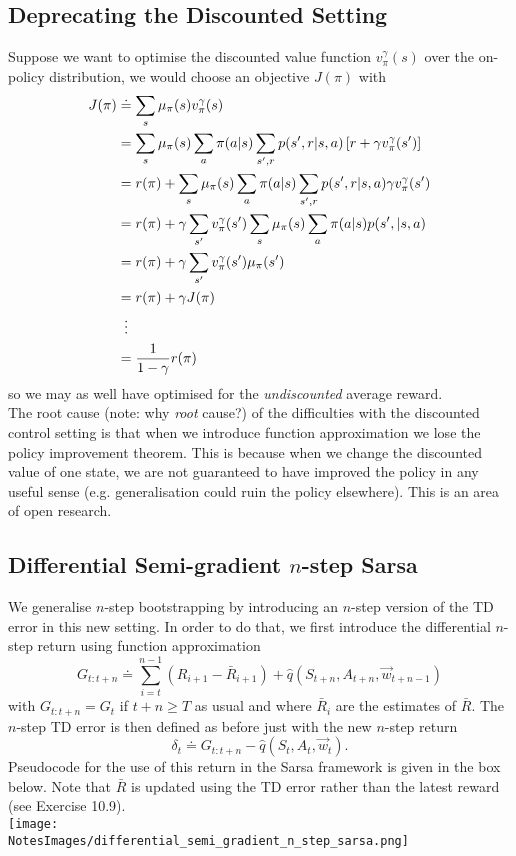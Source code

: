 \subsection{Deprecating the Discounted Setting}
Suppose we want to optimise the discounted value function $v_\pi^\gamma(s)$ over the on-policy distribution, we would choose an objective $J(\pi)$ with
\begin{align}
    J(\pi) &\doteq \sum_s \mu_\pi(s) v_\pi^\gamma(s) \\
           &= \sum_s \mu_\pi(s) \sum_a \pi(a \vert{} s) \sum_{s', r} p(s', r \vert{} s, a) \left[ r + \gamma v_\pi^\gamma(s')\right] \\
           &= r(\pi) + \sum_s \mu_\pi(s) \sum_a \pi(a \vert{} s) \sum_{s', r} p(s', r \vert{}  s, a) \gamma v_\pi^\gamma(s') \\
           &= r(\pi) + \gamma \sum_{s'} v_\pi^\gamma(s') \sum_{s} \mu_\pi(s) \sum_a \pi(a \vert{} s)p(s', \vert{}  s, a) \\
           &= r(\pi) + \gamma \sum_{s'} v_\pi^\gamma(s') \mu_\pi(s') \\
           &= r(\pi) + \gamma J(\pi) \\
           &\vdotswithin{=} \\
           &= \frac{1}{1 - \gamma} r(\pi)
\end{align}
so we may as well have optimised for the \emph{undiscounted} average reward.\\

The root cause (note: why \emph{root} cause?) of the difficulties with the discounted control setting is that when we introduce function approximation we lose the policy improvement theorem. This is because when we change the discounted value of one state, we are not guaranteed to have improved the policy in any useful sense (e.g. generalisation could ruin the policy elsewhere). This is an area of open research.

\subsection{Differential Semi-gradient $n$-step Sarsa}
We generalise $n$-step bootstrapping by introducing an $n$-step version of the TD error  in this new setting. In order to do that, we first introduce the differential $n$-step return using function approximation
\begin{equation}
    G_{t:t+n} \doteq \sum_{i=t}^{n-1} \left( R_{i +1} - \bar{R}_{i+1} \right) + \hat{q}(S_{t+n}, A_{t+n}, \vec{w}_{t+n-1})
\end{equation}
with $G_{t:t+n} = G_t$ if $t+n \geq T$ as usual and where $\bar{R}_i$ are the estimates of $\bar{R}$. The $n$-step TD error is then defined as before just with the new $n$-step return
\[
    \delta_t \doteq G_{t:t+n} - \hat{q}(S_t, A_t, \vec{w}_t).
\]
Pseudocode for the use of this return in the Sarsa framework is given in the box below. Note that $\bar{R}$ is updated using the TD error rather than the latest reward (see Exercise 10.9).\\


\texttt{[image: \\NotesImages/differential\_semi\_gradient\_n\_step\_sarsa.png]}\\
